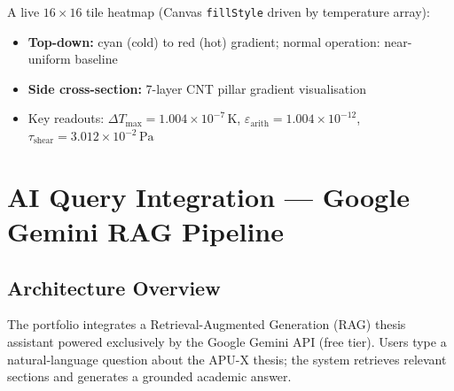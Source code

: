 \documentclass[12pt, a4paper]{article}
\begin{document}
A live $16\times16$ tile heatmap (Canvas \texttt{fillStyle} driven by temperature array):
\begin{itemize}[noitemsep]
  \item \textbf{Top-down:} cyan (cold) to red (hot) gradient; normal operation: near-uniform baseline
  \item \textbf{Side cross-section:} 7-layer CNT pillar gradient visualisation
  \item Key readouts: $\Delta T_{\max} = 1.004 \times 10^{-7}\,\text{K}$, $\varepsilon_{\text{arith}} = 1.004 \times 10^{-12}$, $\tau_{\text{shear}} = 3.012 \times 10^{-2}\,\text{Pa}$
\end{itemize}

\section{AI Query Integration — Google Gemini RAG Pipeline}
\label{sec:ai}

\subsection{Architecture Overview}

The portfolio integrates a Retrieval-Augmented Generation (RAG) thesis assistant
powered exclusively by the Google Gemini API (free tier). Users type a natural-language
question about the APU-X thesis; the system retrieves relevant sections and generates
a grounded academic answer.
\end{document}
